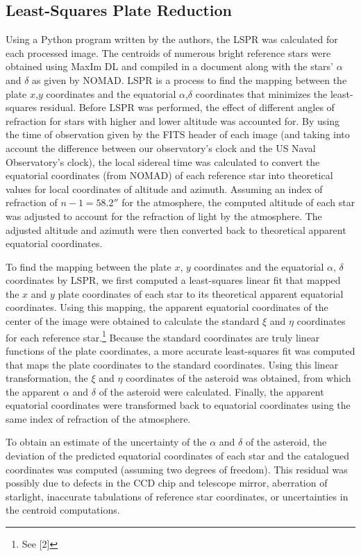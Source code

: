 \documentclass[12pt,journal,compsoc]{IEEEtran}
\begin{document}
\subsection{Least-Squares Plate Reduction}
Using a Python program written by the authors, the LSPR was calculated for each processed image.
The centroids of numerous bright reference stars were obtained using MaxIm DL and compiled in a document along with the stars' $\alpha$ and $\delta$ as given by NOMAD.
LSPR is a process to find the mapping between the plate $x$,$y$ coordinates and the equatorial $\alpha$,$\delta$ coordinates
that minimizes the least-squares residual. 
Before LSPR was performed, the effect of different angles of refraction for stars with higher and lower altitude was accounted for. 
By using the time of observation given by the FITS header of each image (and taking into account the difference between our observatory's clock and the US Naval Observatory's clock), 
the local sidereal time was calculated to convert the equatorial coordinates (from NOMAD) of each reference star 
into theoretical values for local coordinates of altitude and azimuth.
Assuming an index of refraction of $n-1=58.2''$ for the atmosphere, the computed altitude of each star was adjusted to account for the refraction of light by the atmosphere.
The adjusted altitude and azimuth were then converted back to theoretical apparent equatorial coordinates.

To find the mapping between the plate $x$, $y$ coordinates and the equatorial $\alpha$, $\delta$ coordinates by LSPR, we first computed a least-squares linear fit that mapped the $x$ and $y$ plate coordinates of each star to its theoretical apparent equatorial coordinates.
Using this mapping, the apparent equatorial coordinates of the center of the image were obtained to calculate the standard $\xi$ and $\eta$ coordinates for each reference star.\footnote{See [2]} Because the standard coordinates are truly linear functions of the plate coordinates, a more accurate least-squares fit was computed that maps the plate coordinates to the standard coordinates.
Using this linear transformation, the $\xi$ and $\eta$ coordinates of the asteroid was obtained, from which the apparent $\alpha$ and $\delta$ of the asteroid were calculated.
Finally, the apparent equatorial coordinates were transformed back to equatorial coordinates using the same index of refraction of the atmosphere.

To obtain an estimate of the uncertainty of the $\alpha$ and $\delta$ of the asteroid, the deviation of the predicted equatorial coordinates of each star and the catalogued coordinates was computed (assuming two degrees of freedom).
This residual was possibly due to defects in the CCD chip and telescope mirror, aberration of starlight, inaccurate tabulations of reference star coordinates, or uncertainties in the centroid computations.
\end{document}
